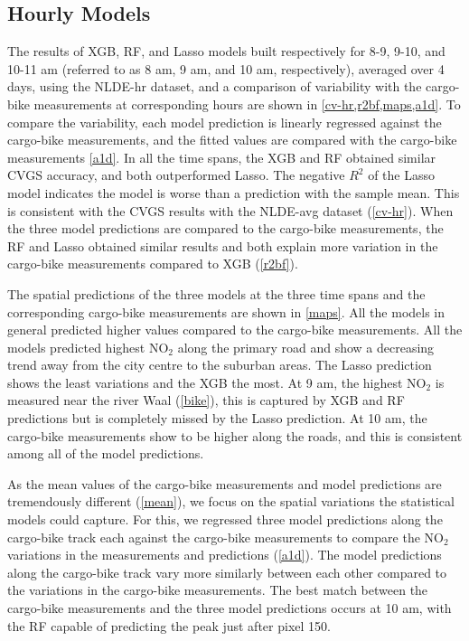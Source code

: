 \documentclass{article}
\begin{document}
 
 
\subsection{Hourly Models}
The results of XGB, RF, and Lasso models built respectively for 8-9, 9-10, and 10-11 am (referred to as 8 am, 9 am, and 10 am, respectively), averaged over 4 days, using the NLDE-hr dataset, and a comparison of variability with the cargo-bike measurements at corresponding hours are shown in \cref{cv-hr,r2bf,maps,a1d}. To compare the variability, each model prediction is linearly regressed against the cargo-bike measurements, and the fitted values are compared with the cargo-bike measurements \cref{a1d}. In all the time spans, the XGB and RF obtained similar CVGS accuracy, and both outperformed Lasso. The negative $R^2$ of the Lasso model indicates the model is worse than a prediction with the sample mean. This is consistent with the CVGS results with the NLDE-avg dataset (\cref{cv-hr}). When the three model predictions are compared to the cargo-bike measurements, the RF and Lasso obtained similar results and both explain more variation in the cargo-bike measurements compared to XGB (\cref{r2bf}).  
 
 The spatial predictions of the three models at the three time spans and the corresponding cargo-bike measurements are shown in \cref{maps}. All the models in general predicted higher values compared to the cargo-bike measurements. All the models predicted highest NO$_2$ along the primary road and show a decreasing trend away from the city centre to the suburban areas. The Lasso prediction shows the least variations and the XGB the most. At 9 am, the highest NO$_2$ is measured near the river Waal (\cref{bike}), this is captured by XGB and RF predictions but is completely missed by the Lasso prediction. At 10 am, the cargo-bike measurements show to be higher along the roads, and this is consistent among all of the model predictions.  
 
 As the mean values of the cargo-bike measurements and model predictions are tremendously different (\cref{mean}), we focus on the spatial variations the statistical models could capture. For this, we regressed three model predictions along the cargo-bike track each against the cargo-bike measurements to compare the NO$_2$ variations in the measurements and predictions (\cref{a1d}). The model predictions along the cargo-bike track vary more similarly between each other compared to the variations in the cargo-bike measurements.  The best match between the cargo-bike measurements and the three model predictions occurs at 10 am, with the RF capable of predicting the peak just after pixel 150.  
 
\end{document}
